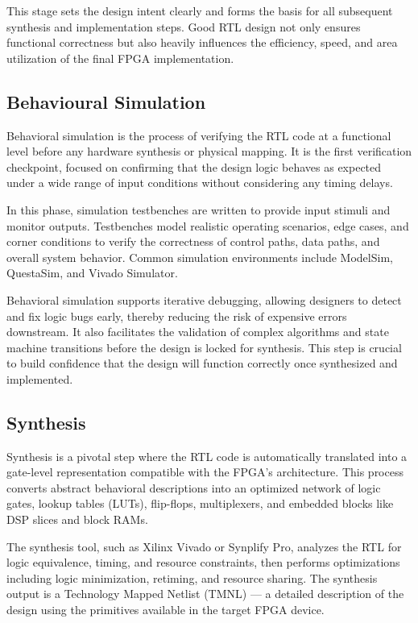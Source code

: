 This stage sets the design intent clearly and forms the basis for all subsequent synthesis and implementation steps. Good RTL design not only ensures functional correctness but also heavily influences the efficiency, speed, and area utilization of the final FPGA implementation.

\subsection{Behavioural Simulation}
Behavioral simulation is the process of verifying the RTL code at a functional level before any hardware synthesis or physical mapping. It is the first verification checkpoint, focused on confirming that the design logic behaves as expected under a wide range of input conditions without considering any timing delays.

In this phase, simulation testbenches are written to provide input stimuli and monitor outputs. Testbenches model realistic operating scenarios, edge cases, and corner conditions to verify the correctness of control paths, data paths, and overall system behavior. Common simulation environments include ModelSim, QuestaSim, and Vivado Simulator.

Behavioral simulation supports iterative debugging, allowing designers to detect and fix logic bugs early, thereby reducing the risk of expensive errors downstream. It also facilitates the validation of complex algorithms and state machine transitions before the design is locked for synthesis. This step is crucial to build confidence that the design will function correctly once synthesized and implemented.

\subsection{Synthesis}
Synthesis is a pivotal step where the RTL code is automatically translated into a gate-level representation compatible with the FPGA's architecture. This process converts abstract behavioral descriptions into an optimized network of logic gates, lookup tables (LUTs), flip-flops, multiplexers, and embedded blocks like DSP slices and block RAMs.

The synthesis tool, such as Xilinx Vivado or Synplify Pro, analyzes the RTL for logic equivalence, timing, and resource constraints, then performs optimizations including logic minimization, retiming, and resource sharing. The synthesis output is a Technology Mapped Netlist (TMNL) — a detailed description of the design using the primitives available in the target FPGA device.

